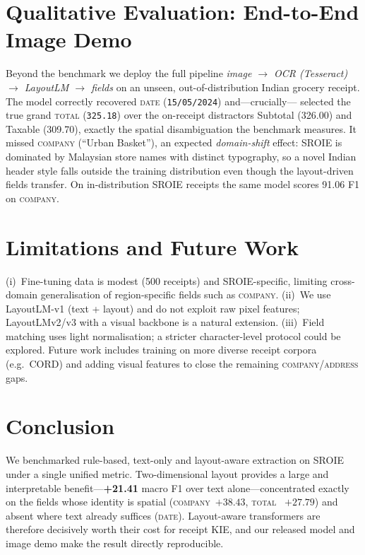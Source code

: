\documentclass[11pt]{article}
\begin{document}
\section{Qualitative Evaluation: End-to-End Image Demo}
Beyond the benchmark we deploy the full pipeline
\emph{image $\rightarrow$ OCR (Tesseract) $\rightarrow$ LayoutLM
$\rightarrow$ fields} on an unseen, out-of-distribution Indian grocery receipt.
The model correctly recovered \textsc{date} (\texttt{15/05/2024}) and---crucially---%
selected the true grand \textsc{total} (\texttt{325.18}) over the on-receipt
distractors Subtotal (326.00) and Taxable (309.70), exactly the spatial
disambiguation the benchmark measures. It missed \textsc{company}
(``Urban Basket''), an expected \emph{domain-shift} effect: SROIE is dominated by
Malaysian store names with distinct typography, so a novel Indian header style
falls outside the training distribution even though the layout-driven fields
transfer. On in-distribution SROIE receipts the same model scores 91.06 F1 on
\textsc{company}.

\section{Limitations and Future Work}
(i)~Fine-tuning data is modest (500 receipts) and SROIE-specific, limiting
cross-domain generalisation of region-specific fields such as \textsc{company}.
(ii)~We use LayoutLM-v1 (text + layout) and do not exploit raw pixel features;
LayoutLMv2/v3 with a visual backbone is a natural extension. (iii)~Field matching
uses light normalisation; a stricter character-level protocol could be explored.
Future work includes training on more diverse receipt corpora (e.g.\ CORD) and
adding visual features to close the remaining \textsc{company}/\textsc{address}
gaps.

\section{Conclusion}
We benchmarked rule-based, text-only and layout-aware extraction on SROIE under a
single unified metric. Two-dimensional layout provides a large and interpretable
benefit---\textbf{+21.41} macro F1 over text alone---concentrated exactly on the
fields whose identity is spatial (\textsc{company}~$+38.43$, \textsc{total}~%
$+27.79$) and absent where text already suffices (\textsc{date}). Layout-aware
transformers are therefore decisively worth their cost for receipt KIE, and our
released model and image demo make the result directly reproducible.
\end{document}
